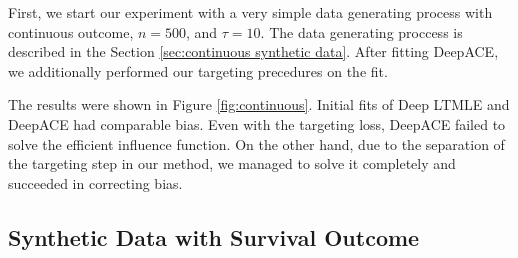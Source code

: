 \documentclass{article}
\theoremstyle{plain}
\theoremstyle{definition}
\theoremstyle{remark}
\begin{document}
\label{sec:continuous outcome experiment}

First, we start our experiment with a very simple data generating process with continuous outcome, $n=500$, and $\tau=10$. The data generating proccess is described in the Section \ref{sec:continuous synthetic data}. After fitting DeepACE, we additionally performed our targeting precedures on the fit. %

The results were shown in Figure \ref{fig:continuous}. Initial fits of Deep LTMLE and DeepACE had comparable bias. Even with the targeting loss, DeepACE failed to solve the efficient influence function. On the other hand, due to the separation of the targeting step in our method, we managed to solve it completely and succeeded in correcting bias.

\subsection{Synthetic Data with Survival Outcome}

\begin{table}[ht]
\centering
\caption{Results from semi-synthetic data with unmeasured confounding}
\label{table-r2}
\end{table}
\end{document}
